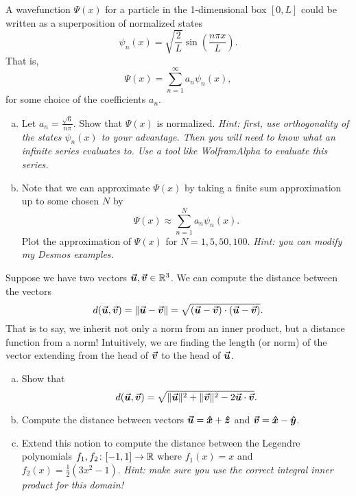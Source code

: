 \documentclass[12pt]{article} %
\begin{document}
\begin{problem}
	A wavefunction $\Psi(x)$ for a particle in the 1-dimensional box $[0,L]$ could be written as a superposition of normalized states
	\[
	\psi_n(x) = \sqrt{\frac{2}{L}} \sin\left(\frac{n\pi x}{L}\right).
	\]
	That is,
	\[
	\Psi(x) = \sum_{n=1}^\infty a_n \psi_n(x),
	\]
	for some choice of the coefficients $a_n$.
	\begin{enumerate}[(a)]
		\item Let $a_n = \frac{\sqrt{6}}{n\pi}$. Show that $\Psi(x)$ is normalized. \emph{Hint: first, use orthogonality of the states $\psi_n(x)$ to your advantage. Then you will need to know what an infinite series evaluates to. Use a tool like WolframAlpha to evaluate this series.}
		\item Note that we can approximate $\Psi(x)$ by taking a finite sum approximation up to some chosen $N$ by
		\[
			\Psi(x) \approx \sum_{n=1}^N a_n \psi_n(x).
		\]
		Plot the approximation of $\Psi(x)$ for $N=1,5,50,100$.  \emph{Hint: you can modify my Desmos examples.}
		\end{enumerate}
\end{problem}

\begin{problem}
	Suppose we have two vectors $\boldsymbol{\vec{u}},\boldsymbol{\vec{v}} \in \mathbb{R}^3$.  We can compute the distance between the vectors
	\[
	d(\boldsymbol{\vec{u}},\boldsymbol{\vec{v}}) = \|\boldsymbol{\vec{u}}-\boldsymbol{\vec{v}}\| = \sqrt{(\boldsymbol{\vec{u}}-\boldsymbol{\vec{v}})\cdot(\boldsymbol{\vec{u}}-\boldsymbol{\vec{v}})}.
	\]
	That is to say, we inherit not only a norm from an inner product, but a distance function from a norm!  Intuitively, we are finding the length (or norm) of the vector extending from the head of $\boldsymbol{\vec{v}}$ to the head of $\boldsymbol{\vec{u}}$.
	\begin{enumerate}[(a)]
		\item Show that
		\[
		d(\boldsymbol{\vec{u}},\boldsymbol{\vec{v}}) = \sqrt{\|\boldsymbol{\vec{u}}\|^2+\|\boldsymbol{\vec{v}}\|^2-2\boldsymbol{\vec{u}}\cdot \boldsymbol{\vec{v}}}.
		\]
		\item Compute the distance between vectors $\boldsymbol{\vec{u}}=\boldsymbol{\hat{x}} + \boldsymbol{\hat{z}}$ and $\boldsymbol{\vec{v}} = \boldsymbol{\hat{x}} - \boldsymbol{\hat{y}}$.  
		\item Extend this notion to compute the distance between the Legendre polynomials $f_1,f_2\colon [-1,1] \to \mathbb{R}$ where $f_1(x)=x$ and $f_2(x)=\frac{1}{2}\left(3x^2-1\right)$. \emph{Hint: make sure you use the correct integral inner product for this domain!}
	\end{enumerate}
\end{problem}
\end{document}
